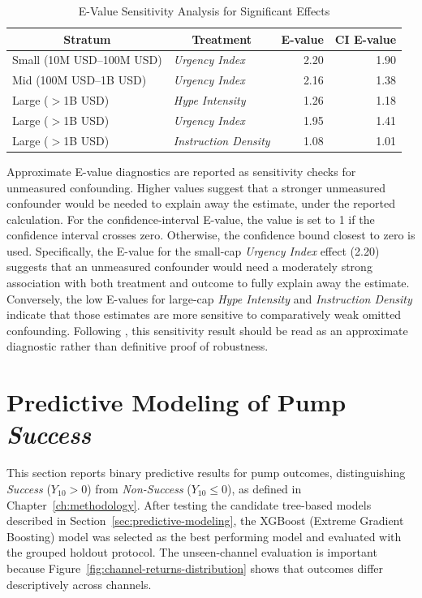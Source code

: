 \begin{table}[htbp]
\centering
\caption{E-Value Sensitivity Analysis for Significant Effects}
\label{tab:evalue-results}
\begin{tabular}{|l|l|r|r|}
\toprule
\multicolumn{1}{|c|}{\textbf{Stratum}} & \multicolumn{1}{c|}{\textbf{Treatment}} & \multicolumn{1}{c|}{\textbf{E-value}} & \multicolumn{1}{c|}{\textbf{CI E-value}} \\
\midrule
Small (10M USD--100M USD) & \textit{Urgency Index} & 2.20 & 1.90 \\
Mid (100M USD--1B USD) & \textit{Urgency Index} & 2.16 & 1.38 \\
Large ($>$1B USD) & \textit{Hype Intensity} & 1.26 & 1.18 \\
Large ($>$1B USD) & \textit{Urgency Index} & 1.95 & 1.41 \\
Large ($>$1B USD) & \textit{Instruction Density} & 1.08 & 1.01 \\
\bottomrule
\end{tabular}
\end{table}

Approximate E-value diagnostics are reported as sensitivity checks for unmeasured confounding. Higher values suggest that a stronger unmeasured confounder would be needed to explain away the estimate, under the reported calculation. For the confidence-interval E-value, the value is set to 1 if the confidence interval crosses zero. Otherwise, the confidence bound closest to zero is used. Specifically, the E-value for the small-cap \textit{Urgency Index} effect (2.20) suggests that an unmeasured confounder would need a moderately strong association with both treatment and outcome to fully explain away the estimate. Conversely, the low E-values for large-cap \textit{Hype Intensity} and \textit{Instruction Density} indicate that those estimates are more sensitive to comparatively weak omitted confounding. Following \cite{vanderweele2017sensitivity}, this sensitivity result should be read as an approximate diagnostic rather than definitive proof of robustness.


\section{Predictive Modeling of Pump \textit{Success}}
\label{sec:prediction-results}

This section reports binary predictive results for pump outcomes, distinguishing \textit{Success} ($Y_{10}>0$) from \textit{Non-Success} ($Y_{10}\leq 0$), as defined in Chapter~\ref{ch:methodology}. After testing the candidate tree-based models described in Section~\ref{sec:predictive-modeling}, the XGBoost (Extreme Gradient Boosting) model was selected as the best performing model and evaluated with the grouped holdout protocol. The unseen-channel evaluation is important because Figure~\ref{fig:channel-returns-distribution} shows that outcomes differ descriptively across channels.

